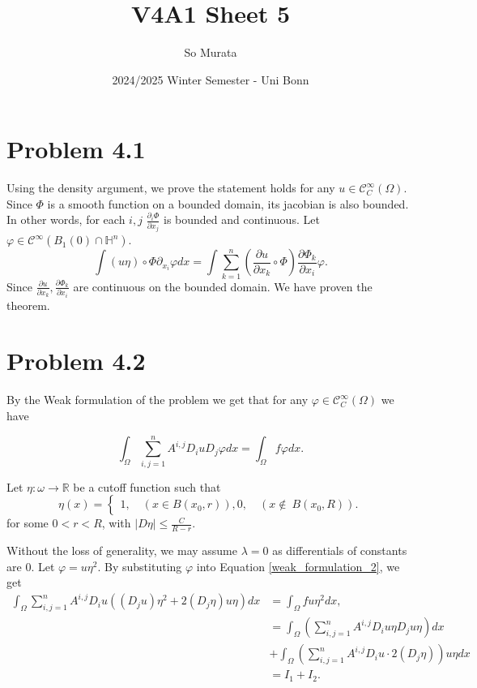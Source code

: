 \documentclass{article}
\title{V4A1 Sheet 5}
\author{So Murata}
\date{2024/2025 Winter Semester - Uni Bonn}
\begin{document}
\maketitle
\section*{Problem 4.1}

Using the density argument, we prove the statement holds for any $u\in\mathcal{C}^\infty_C(\Omega)$. Since $\Phi$ is a smooth function on a bounded domain, its jacobian is also bounded. In other words, for each $i,j$ ${\frac {\partial_i\Phi} {\partial x_j}}$ is bounded and continuous. Let $\varphi\in\mathcal{C}^\infty(B_1(0)\cap\mathbb{H}^n)$.
\begin{equation*}
\int (u\eta)\circ\Phi \partial_{x_i}\varphi dx = \int \sum_{k=1}^n ({\frac {\partial u} {\partial x_k}}\circ \Phi){\frac {\partial \Phi_k} {\partial x_i}}\varphi.
\end{equation*}
Since ${\frac {\partial u} {\partial x_k}},{\frac {\partial \Phi_k} {\partial x_i}}$ are continuous on the bounded domain. We have proven the theorem.
\section*{Problem 4.2}

By the Weak formulation of the problem we get that for any $\varphi\in\mathcal{C}^\infty_C(\Omega)$ we have

\begin{equation}
\int_\Omega \sum_{i,j=1}^n A^{i,j}D_iuD_j\varphi dx = \int_\Omega f\varphi dx.
\label{weak_formulation_2}
\end{equation}

Let $\eta:\omega\to\mathbb{R}$ be a cutoff function such that
\begin{equation*}
\eta(x) = 
\begin{cases}
1,\quad(x\in B(x_0,r)),
0, \quad (x\not\in\ B(x_0,R)).
\end{cases}
\end{equation*}
for some $0<r<R$, with $|D\eta|\leq {\frac C {R-r}}$.\\
\par Without the loss of generality, we may assume $\lambda=0$ as differentials of constants are $0$. Let $\varphi=u\eta^2$. 
By substituting $\varphi$ into Equation \eqref{weak_formulation_2}, we get
\begin{align*}
\int_\Omega \sum_{i,j=1}^n A^{i,j}D_iu((D_ju)\eta^2+2(D_j\eta)u\eta) dx &= \int_\Omega fu\eta^2 dx,\\
& =\int_\Omega \left(\sum_{i,j=1}^n A^{i,j}D_iu\eta D_ju\eta\right) dx\\
&+\int_\Omega\left(\sum_{i,j=1}^n A^{i,j}D_iu\cdot 2(D_j\eta)\right)u\eta  dx\\
& = I_1+I_2.
\end{align*}
\end{document}
